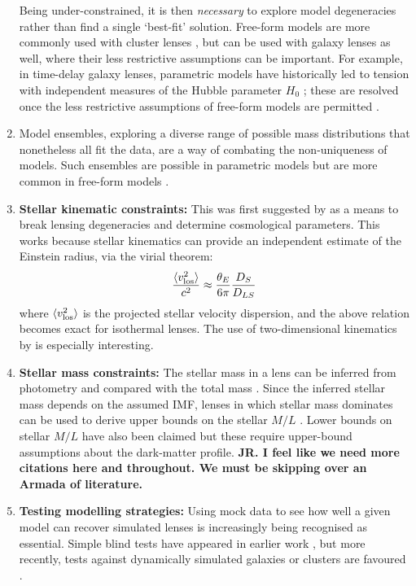 \documentclass[galley,usenatbib]{mn2e}
\newcommand{\hilight}[1]{{\bf \color{red} #1}}
\begin{document}
\begin{enumerate}
  Being under-constrained, it is then {\it necessary} to explore model degeneracies rather than find a single `best-fit' solution. Free-form models are more commonly used with
  cluster lenses \citep{2006ApJ...652L...5S,2009ApJ...690..154S,2009A&A...500..681M,2013arXiv1304.2393S}, but
  can be used with galaxy lenses as well, where their less restrictive
  assumptions can be important.  For example, in time-delay galaxy
  lenses, parametric models have historically led to tension with independent measures of the Hubble parameter
  $H_0$ \citep[e.g.][]{2002astro.ph..4043K,2002ApJ...578...25K}; these are resolved once the less restrictive assumptions of free-form models are permitted \citep{2007ApJ...667..645R}.
\item Model ensembles, exploring a diverse range of possible mass
  distributions that nonetheless all fit the data, are a way of
  combating the non-uniqueness of models.  Such ensembles are
  possible in parametric models \citep{1999AJ....118...14B} but are
  more common in free-form models
  \citep{2000AJ....119..439W,2009ApJ...690..154S,2012MNRAS.425.3077L}.
\item {\bf Stellar kinematic constraints:} This was first suggested by \citet{2002MNRAS.337L...6T} as a means to break lensing degeneracies and determine cosmological parameters. This works because stellar kinematics can provide an independent estimate of the Einstein radius, via the virial theorem:
%
\begin{equation}
  \frac{\langle v^2_{\rm los}\rangle}{c^2} \approx
  \frac{\theta_E}{6\pi} \frac{D_S}{D_{LS}}
\label{eqn:virial}
\end{equation}
 where $\langle v^2_{\rm los}\rangle$ is the projected stellar velocity dispersion, and the above relation becomes exact for isothermal lenses.  The use of
  two-dimensional kinematics by \cite{2011MNRAS.415.2215B} is
  especially interesting.
\item {\bf Stellar mass constraints:} The stellar mass in a lens can be inferred from photometry and
  compared with the total mass
  \citep{2005ApJ...623L...5F,2008MNRAS.383..857F,2011ApJ...740...97L}.
  Since the inferred stellar mass depends on the assumed IMF,
  lenses in which stellar mass dominates can be used to derive upper
  bounds on the stellar $M/L$ \citep{2010MNRAS.409L..30F}. Lower bounds
  on stellar $M/L$ have also been claimed \citep{2013MNRAS.428.3183D}
  but these require upper-bound assumptions about the dark-matter
  profile. \hilight{JR. I feel like we need more citations here and throughout. We must be skipping over an Armada of literature.}
\item {\bf Testing modelling strategies:} Using mock data to see how well a given model can recover
  simulated lenses is increasingly being recognised as essential.  Simple
  blind tests have appeared in earlier work \citep[for example, Figure
    2 in][]{2000AJ....119..439W}, but more recently, tests against
  dynamically simulated galaxies or clusters are favoured
  \citep{2007ApJ...667..645R,2007MNRAS.380.1729L,2009A&A...500..681M,2009MNRAS.393.1114B,2010ApJ...723.1678C}.
\end{enumerate}
\end{document}
